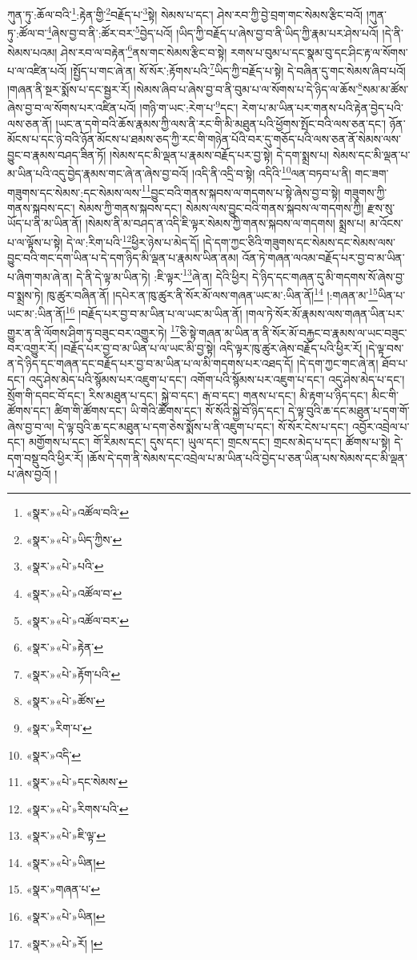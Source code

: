 ཀུན་ཏུ་:ཆོལ་བའི་\footnote{«སྣར་»«པེ་»འཚོལ་བའི་}:རྟེན་གྱི་\footnote{«སྣར་»«པེ་»ཡིད་ཀྱིས་}བརྗོད་པ་\footnote{«སྣར་»«པེ་»པའི་}སྟེ། སེམས་པ་དང་། ཤེས་རབ་ཀྱི་བྱེ་བྲག་གང་སེམས་རྩིང་བའོ། །ཀུན་ཏུ་:ཚོལ་བ་\footnote{«སྣར་»«པེ་»འཚོལ་བ་}ཞེས་བྱ་བ་ནི་:ཚོར་བར་\footnote{«སྣར་»«པེ་»འཚོལ་བར་}བྱེད་པའོ། །ཡིད་ཀྱི་བརྗོད་པ་ཞེས་བྱ་བ་ནི་ཡིད་ཀྱི་རྣམ་པར་ཤེས་པའོ། །དེ་ནི་སེམས་པའམ། ཤེས་རབ་ལ་བརྟེན་\footnote{«སྣར་»«པེ་»རྟེན་}ནས་གང་སེམས་རྩིང་བ་སྟེ། རགས་པ་བུམ་པ་དང་སྣམ་བུ་དང་ཤིང་རྟ་ལ་སོགས་པ་ལ་འཛིན་པའོ། །སྤྱོད་པ་གང་ཞེ་ན། སོ་སོར་:རྟོགས་པའི་\footnote{«སྣར་»«པེ་»རྟོག་པའི་}ཡིད་ཀྱི་བརྗོད་པ་སྟེ། དེ་བཞིན་དུ་གང་སེམས་ཞིབ་པའོ། །གཞན་ནི་སྔར་སྨོས་པ་དང་སྦྱར་རོ། །སེམས་ཞིབ་པ་ཞེས་བྱ་བ་ནི་བུམ་པ་ལ་སོགས་པ་དེ་ཉིད་ལ་ཆོས་\footnote{«སྣར་»«པེ་»ཚོས་}སམ་མ་ཚོས་ཞེས་བྱ་བ་ལ་སོགས་པར་འཛིན་པའོ། །གཉི་ག་ཡང་:རེག་པ་\footnote{«སྣར་»རིག་པ་}དང་། རེག་པ་མ་ཡིན་པར་གནས་པའི་རྟེན་བྱེད་པའི་ལས་ཅན་ནོ། །ཡང་ན་དགེ་བའི་ཆོས་རྣམས་ཀྱི་ལས་ནི་རང་གི་མི་མཐུན་པའི་ཕྱོགས་སྤོང་བའི་ལས་ཅན་དང་། ཉོན་མོངས་པ་དང་ཉེ་བའི་ཉོན་མོངས་པ་ཐམས་ཅད་ཀྱི་རང་གི་གཉེན་པོའི་བར་དུ་གཅོད་པའི་ལས་ཅན་ནོ་སེམས་ལས་བྱུང་བ་རྣམས་བཤད་ཟིན་ཏོ། །སེམས་དང་མི་ལྡན་པ་རྣམས་བརྗོད་པར་བྱ་སྟེ། དེ་དག་སྨྲས་པ། སེམས་དང་མི་ལྡན་པ་མ་ཡིན་པའི་འདུ་བྱེད་རྣམས་གང་ཞེ་ན་ཞེས་བྱ་བའོ། །འདི་ནི་འདྲི་བ་སྟེ། འདིའི་\footnote{«སྣར་»འདི་}ལན་བཏབ་པ་ནི། གང་ཟག་གཟུགས་དང་སེམས་:དང་སེམས་ལས་\footnote{«སྣར་»«པེ་»དང་སེམས་}བྱུང་བའི་གནས་སྐབས་ལ་གདགས་པ་སྟེ་ཞེས་བྱ་བ་སྟེ། གཟུགས་ཀྱི་གནས་སྐབས་དང་། སེམས་ཀྱི་གནས་སྐབས་དང་། སེམས་ལས་བྱུང་བའི་གནས་སྐབས་ལ་གདགས་ཀྱི། རྫས་སུ་ཡོད་པ་ནི་མ་ཡིན་ནོ། །སེམས་ནི་མ་བཤད་ན་འདི་ཇི་ལྟར་སེམས་ཀྱི་གནས་སྐབས་ལ་གདགས། སྨྲས་པ། མ་འོངས་པ་ལ་ལྟོས་པ་སྟེ། དེ་ལ་:རིག་པའི་\footnote{«སྣར་»«པེ་»རིགས་པའི་}ཕྱིར་ཉེས་པ་མེད་དོ། །དེ་དག་ཀྱང་ཅིའི་གཟུགས་དང་སེམས་དང་སེམས་ལས་བྱུང་བའི་གང་དག་ཡིན་པ་དེ་དག་ཉིད་མི་ལྡན་པ་རྣམས་ཡིན་ནམ། འོན་ཏེ་གཞན་ལའམ་བརྗོད་པར་བྱ་བ་མ་ཡིན་པ་ཞིག་གམ་ཞེ་ན། དེ་ནི་དེ་ལྟ་མ་ཡིན་ཏེ། :ཇི་ལྟར་\footnote{«སྣར་»«པེ་»ཇི་ལྟ་}ཞེ་ན། དེའི་ཕྱིར། དེ་ཉིད་དང་གཞན་དུ་མི་གདགས་སོ་ཞེས་བྱ་བ་སྨྲས་ཏེ། ཁུ་ཚུར་བཞིན་ནོ། །དཔེར་ན་ཁུ་ཚུར་ནི་སོར་མོ་ལས་གཞན་ཡང་མ་:ཡིན་ནོ།\footnote{«སྣར་»«པེ་»ཡིན།} །:གཞན་མ་\footnote{«སྣར་»གཞན་པ་}ཡིན་པ་ཡང་མ་:ཡིན་ནོ།\footnote{«སྣར་»«པེ་»ཡིན།} །བརྗོད་པར་བྱ་བ་མ་ཡིན་པ་ལ་ཡང་མ་ཡིན་ནོ། །གལ་ཏེ་སོར་མོ་རྣམས་ལས་གཞན་ཡིན་པར་གྱུར་ན་ནི་ལོགས་ཤིག་ཏུ་བཟུང་བར་འགྱུར་ཏེ། \footnote{«སྣར་»«པེ་»རོ། ། }ཅི་སྟེ་གཞན་མ་ཡིན་ན་ནི་སོར་མོ་བརྐྱང་བ་རྣམས་ལ་ཡང་བཟུང་བར་འགྱུར་རོ། །བརྗོད་པར་བྱ་བ་མ་ཡིན་པ་ལ་ཡང་མི་བྱ་སྟེ། འདི་ལྟར་ཁུ་ཚུར་ཞེས་བརྗོད་པའི་ཕྱིར་རོ། །དེ་ལྟ་བས་ན་དེ་ཉིད་དང་གཞན་དང་བརྗོད་པར་བྱ་བ་མ་ཡིན་པ་ལ་མི་གདགས་པར་འཐད་དོ། །དེ་དག་ཀྱང་གང་ཞེ་ན། ཐོབ་པ་དང་། འདུ་ཤེས་མེད་པའི་སྙོམས་པར་འཇུག་པ་དང་། འགོག་པའི་སྙོམས་པར་འཇུག་པ་དང་། འདུ་ཤེས་མེད་པ་དང་། སྲོག་གི་དབང་བོ་དང་། རིས་མཐུན་པ་དང་། སྐྱེ་བ་དང་། རྒ་བ་དང་། གནས་པ་དང་། མི་རྟག་པ་ཉིད་དང་། མིང་གི་ཚོགས་དང་། ཚིག་གི་ཚོགས་དང་། ཡི་གེའི་ཚོགས་དང་། སོ་སོའི་སྐྱེ་བོ་ཉིད་དང་། དེ་ལྟ་བུའི་ཆ་དང་མཐུན་པ་དག་གོ་ཞེས་བྱ་བ་ལ། དེ་ལྟ་བུའི་ཆ་དང་མཐུན་པ་དག་ཅེས་སྨོས་པ་ནི་འཇུག་པ་དང་། སོ་སོར་ངེས་པ་དང་། འབྱོར་འབྲེལ་པ་དང་། མགྱོགས་པ་དང་། གོ་རིམས་དང་། དུས་དང་། ཡུལ་དང་། གྲངས་དང་། གྲངས་མེད་པ་དང་། ཚོགས་པ་སྟེ། དེ་དག་བསྡུ་བའི་ཕྱིར་རོ། །ཆོས་དེ་དག་ནི་སེམས་དང་འབྲེལ་པ་མ་ཡིན་པའི་བྱེད་པ་ཅན་ཡིན་པས་སེམས་དང་མི་ལྡན་པ་ཞེས་བྱའོ། །

